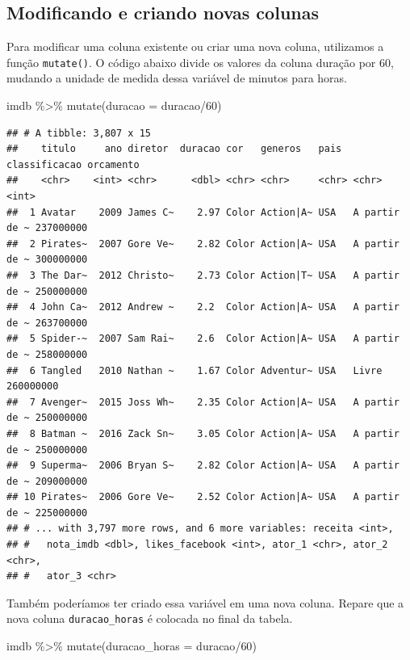 \documentclass[
]{book}
\newenvironment{Shaded}{\begin{snugshade}}{\end{snugshade}}
\newcommand{\AttributeTok}[1]{\textcolor[rgb]{0.77,0.63,0.00}{#1}}
\newcommand{\DecValTok}[1]{\textcolor[rgb]{0.00,0.00,0.81}{#1}}
\newcommand{\FunctionTok}[1]{\textcolor[rgb]{0.00,0.00,0.00}{#1}}
\newcommand{\NormalTok}[1]{#1}
\newcommand{\SpecialCharTok}[1]{\textcolor[rgb]{0.00,0.00,0.00}{#1}}
\begin{document}
\hypertarget{modificando-e-criando-novas-colunas}{%
\subsection{Modificando e criando novas colunas}\label{modificando-e-criando-novas-colunas}}

Para modificar uma coluna existente ou criar uma nova coluna, utilizamos a função \texttt{mutate()}. O código abaixo divide os valores da coluna duração por 60, mudando a unidade de medida dessa variável de minutos para horas.

\begin{Shaded}
\begin{Highlighting}[]
\NormalTok{imdb }\SpecialCharTok{\%\textgreater{}\%} \FunctionTok{mutate}\NormalTok{(}\AttributeTok{duracao =}\NormalTok{ duracao}\SpecialCharTok{/}\DecValTok{60}\NormalTok{)}
\end{Highlighting}
\end{Shaded}

\begin{verbatim}
## # A tibble: 3,807 x 15
##    titulo     ano diretor  duracao cor   generos   pais  classificacao orcamento
##    <chr>    <int> <chr>      <dbl> <chr> <chr>     <chr> <chr>             <int>
##  1 Avatar    2009 James C~    2.97 Color Action|A~ USA   A partir de ~ 237000000
##  2 Pirates~  2007 Gore Ve~    2.82 Color Action|A~ USA   A partir de ~ 300000000
##  3 The Dar~  2012 Christo~    2.73 Color Action|T~ USA   A partir de ~ 250000000
##  4 John Ca~  2012 Andrew ~    2.2  Color Action|A~ USA   A partir de ~ 263700000
##  5 Spider-~  2007 Sam Rai~    2.6  Color Action|A~ USA   A partir de ~ 258000000
##  6 Tangled   2010 Nathan ~    1.67 Color Adventur~ USA   Livre         260000000
##  7 Avenger~  2015 Joss Wh~    2.35 Color Action|A~ USA   A partir de ~ 250000000
##  8 Batman ~  2016 Zack Sn~    3.05 Color Action|A~ USA   A partir de ~ 250000000
##  9 Superma~  2006 Bryan S~    2.82 Color Action|A~ USA   A partir de ~ 209000000
## 10 Pirates~  2006 Gore Ve~    2.52 Color Action|A~ USA   A partir de ~ 225000000
## # ... with 3,797 more rows, and 6 more variables: receita <int>,
## #   nota_imdb <dbl>, likes_facebook <int>, ator_1 <chr>, ator_2 <chr>,
## #   ator_3 <chr>
\end{verbatim}

Também poderíamos ter criado essa variável em uma nova coluna. Repare que a nova coluna \texttt{duracao\_horas} é colocada no final da tabela.

\begin{Shaded}
\begin{Highlighting}[]
\NormalTok{imdb }\SpecialCharTok{\%\textgreater{}\%} \FunctionTok{mutate}\NormalTok{(}\AttributeTok{duracao\_horas =}\NormalTok{ duracao}\SpecialCharTok{/}\DecValTok{60}\NormalTok{)}
\end{Highlighting}
\end{Shaded}
\end{document}
